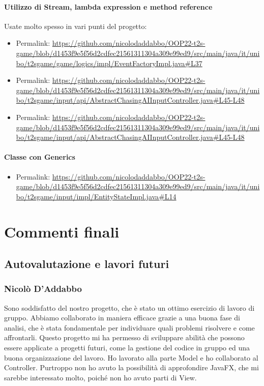 \documentclass[a4paper,12pt]{report}
\begin{document}
\subsubsection*{Utilizzo di Stream, lambda expression e method reference}
Usate molto spesso in vari punti del progetto:
\begin{itemize}
	\item Permalink: \url{https://github.com/nicolodaddabbo/OOP22-t2s-game/blob/d1453f9e5f56d2cdfec21561311304a309e99ed9/src/main/java/it/unibo/t2sgame/game/logics/impl/EventFactoryImpl.java#L37}
	\item Permalink: \url{https://github.com/nicolodaddabbo/OOP22-t2s-game/blob/d1453f9e5f56d2cdfec21561311304a309e99ed9/src/main/java/it/unibo/t2sgame/input/api/AbstractChasingAIInputController.java#L45-L48}
	\item Permalink: \url{https://github.com/nicolodaddabbo/OOP22-t2s-game/blob/d1453f9e5f56d2cdfec21561311304a309e99ed9/src/main/java/it/unibo/t2sgame/input/api/AbstractChasingAIInputController.java#L45-L48}
\end{itemize}
\subsubsection*{Classe con Generics}
\begin{itemize}
	\item Permalink: \url{https://github.com/nicolodaddabbo/OOP22-t2s-game/blob/d1453f9e5f56d2cdfec21561311304a309e99ed9/src/main/java/it/unibo/t2sgame/input/impl/EntityStateImpl.java#L14}
\end{itemize}

\chapter{Commenti finali}

\section{Autovalutazione e lavori futuri}
\subsection*{Nicolò D'Addabbo}
Sono soddisfatto del nostro progetto, che è stato un ottimo esercizio di lavoro di gruppo. Abbiamo collaborato in maniera efficace grazie a una buona fase di analisi, che è stata fondamentale per individuare quali problemi risolvere e come affrontarli. Questo progetto mi ha permesso di sviluppare abilità che possono essere applicate a progetti futuri, come la gestione del codice in gruppo ed una buona organizzazione del lavoro.
Ho lavorato alla parte Model e ho collaborato al Controller. Purtroppo non ho avuto la possibilità di approfondire JavaFX, che mi sarebbe interessato molto, poiché non ho avuto parti di View.
\end{document}
